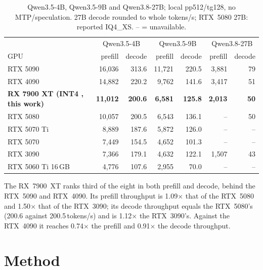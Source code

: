 \documentclass[10.5pt,a4paper]{article}
\newcommand{\tx}[1]{\texttt{\detokenize{#1}}}
\begin{document}
\begin{table}[H]
\centering\fontsize{7.8}{9.3}\selectfont
\setlength{\tabcolsep}{3pt}
\begin{tabular*}{\linewidth}{@{\extracolsep{\fill}}lrrrrrr@{}}
\toprule
 & \multicolumn{2}{c}{Qwen3.5-4B} & \multicolumn{2}{c}{Qwen3.5-9B} & \multicolumn{2}{c}{Qwen3.8-27B}\\
GPU & prefill & decode & prefill & decode & prefill & decode\\
\midrule
RTX 5090 & 16{,}036 & 313.6 & 11{,}721 & 220.5 & 3{,}881 & 79\\
RTX 4090 & 14{,}882 & 220.2 & 9{,}762 & 141.6 & 3{,}417 & 51\\
\textbf{RX 7900 XT (INT4 \tx{fast}, this work)} & \textbf{11{,}012} & \textbf{200.6} & \textbf{6{,}581} & \textbf{125.8} & \textbf{2{,}013} & \textbf{50}\\
RTX 5080 & 10{,}057 & 200.5 & 6{,}543 & 136.1 & -- & 50\\
RTX 5070 Ti & 8{,}889 & 187.6 & 5{,}872 & 126.0 & -- & --\\
RTX 5070 & 7{,}449 & 154.5 & 4{,}652 & 101.3 & -- & --\\
RTX 3090 & 7{,}366 & 179.1 & 4{,}632 & 122.1 & 1{,}507 & 43\\
RTX 5060 Ti 16\,GB & 4{,}776 & 107.6 & 2{,}955 & 70.0 & -- & --\\
\bottomrule
\end{tabular*}
\caption{Qwen3.5-4B, Qwen3.5-9B and Qwen3.8-27B; local pp512/tg128, no MTP/speculation. 27B decode rounded to whole tokens/s; RTX~5080 27B: reported IQ4\_XS. -- = unavailable.}
\end{table}

The RX~7900~XT ranks third of the eight in both prefill and decode, behind the RTX~5090 and RTX~4090. Its prefill throughput is 1.09$\times$ that of the RTX~5080 and 1.50$\times$ that of the RTX~3090;
its decode throughput equals the RTX~5080's (200.6 against 200.5\,tokens/s) and is 1.12$\times$ the RTX~3090's. Against the RTX~4090 it reaches 0.74$\times$ the prefill and 0.91$\times$ the decode throughput.

\section{Method}
\label{sec:method}
\end{document}
